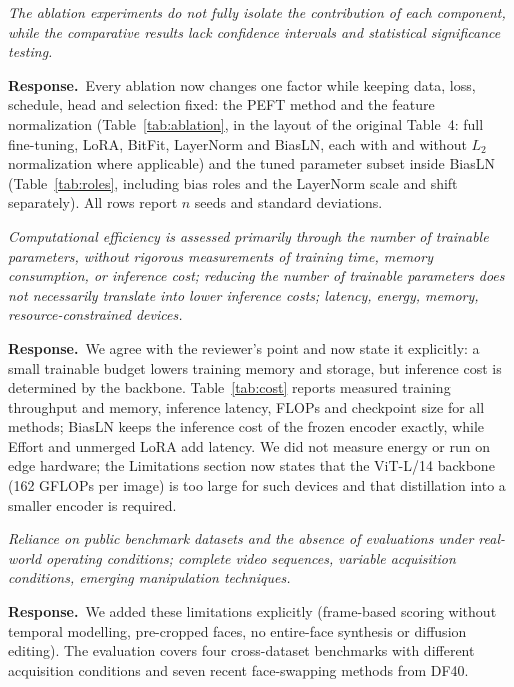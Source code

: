 \documentclass[11pt]{article}
\newenvironment{comment}{\par\medskip\noindent\begin{minipage}{\linewidth}\color{black!70}\itshape}{\end{minipage}\par\smallskip}
\newcommand{\resp}{\noindent\textbf{Response.}~}
\begin{document}
\begin{comment}
The ablation experiments do not fully isolate the contribution of each component, while the comparative results lack confidence intervals and statistical significance testing.
\end{comment}
\resp Every ablation now changes one factor while keeping data, loss, schedule, head and selection fixed: the PEFT method and the feature normalization (Table~\ref{tab:ablation}, in the layout of the original Table~4: full fine-tuning, LoRA, BitFit, LayerNorm and BiasLN, each with and without $L_2$ normalization where applicable) and the tuned parameter subset inside BiasLN (Table~\ref{tab:roles}, including bias roles and the LayerNorm scale and shift separately). All rows report $n$ seeds and standard deviations.

\begin{comment}
Computational efficiency is assessed primarily through the number of trainable parameters, without rigorous measurements of training time, memory consumption, or inference cost; reducing the number of trainable parameters does not necessarily translate into lower inference costs; latency, energy, memory, resource-constrained devices.
\end{comment}
\resp We agree with the reviewer's point and now state it explicitly: a small trainable budget lowers training memory and storage, but inference cost is determined by the backbone. Table~\ref{tab:cost} reports measured training throughput and memory, inference latency, FLOPs and checkpoint size for all methods; BiasLN keeps the inference cost of the frozen encoder exactly, while Effort and unmerged LoRA add latency. We did not measure energy or run on edge hardware; the Limitations section now states that the ViT-L/14 backbone (162 GFLOPs per image) is too large for such devices and that distillation into a smaller encoder is required.

\begin{comment}
Reliance on public benchmark datasets and the absence of evaluations under real-world operating conditions; complete video sequences, variable acquisition conditions, emerging manipulation techniques.
\end{comment}
\resp We added these limitations explicitly (frame-based scoring without temporal modelling, pre-cropped faces, no entire-face synthesis or diffusion editing). The evaluation covers four cross-dataset benchmarks with different acquisition conditions and seven recent face-swapping methods from DF40.
\end{document}
